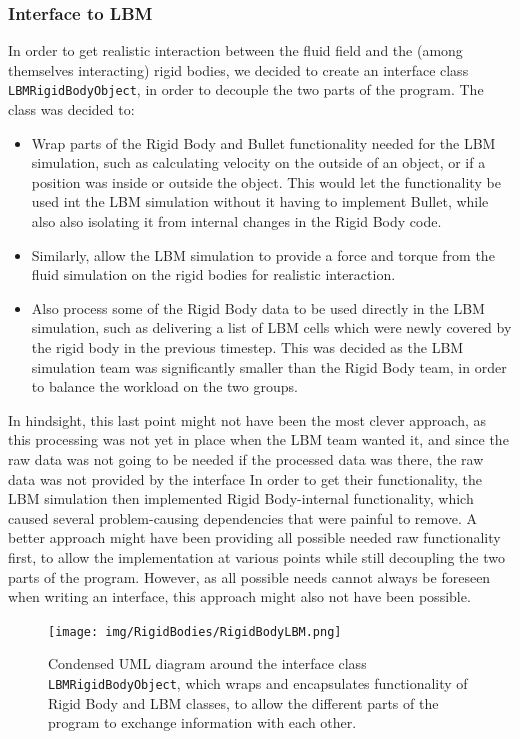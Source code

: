 \subsubsection{Interface to LBM}
In order to get realistic interaction between the fluid field and the (among themselves interacting) rigid bodies, we decided to create an interface class \texttt{LBMRigidBodyObject}, in order to decouple the two parts of the program. The class was decided to:
\begin{itemize}
\item Wrap parts of the Rigid Body and Bullet functionality needed for the LBM simulation, such as calculating velocity on the outside of an object, or if a position was inside or outside the object. This would let the functionality be used int the LBM simulation without it having to implement Bullet, while also also isolating it from internal changes in the Rigid Body code.
\item Similarly, allow the LBM simulation to provide a force and torque from the fluid simulation on the rigid bodies for realistic interaction.
\item Also process some of the Rigid Body data to be used directly in the LBM simulation, such as delivering a list of LBM cells which were newly covered by the rigid body in the previous timestep. This was decided as the LBM simulation team was significantly smaller than the Rigid Body team, in order to balance the workload on the two groups.
\end{itemize}
In hindsight, this last point might not have been the most clever approach, as this processing was not yet in place when the LBM team wanted it, and since the raw data was not going to be needed if the processed data was there, the raw data was not provided by the interface In order to get their functionality, the LBM simulation then implemented Rigid Body-internal functionality, which caused several problem-causing dependencies that were painful to remove. A better approach might have been providing all possible needed raw functionality first, to allow the implementation at various points while still decoupling the two parts of the program. However, as all possible needs cannot always be foreseen when writing an interface, this approach might also not have been possible.

\begin{figure}[htb]
	\texttt{[image: img/RigidBodies/RigidBodyLBM.png]}
	\caption{Condensed UML diagram around the interface class \texttt{LBMRigidBodyObject}, which wraps and encapsulates functionality of Rigid Body and LBM classes, to allow the different parts of the program to exchange information with each other.}
	\label{fig:LBMRigUML}
\end{figure}

